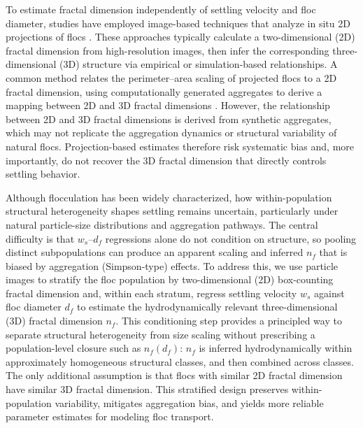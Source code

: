 \documentclass{agujournal2019}
\providecommand{\DIFadd}[1]{{\protect\color{blue}#1}}
\begin{document}
To estimate fractal dimension independently of settling velocity and floc diameter, studies have employed image-based techniques that analyze in situ 2D projections of flocs \cite{jarvis2005measuring}. These approaches typically calculate a two-dimensional (2D) fractal dimension from high-resolution images, then infer the corresponding three-dimensional (3D) structure via empirical or simulation-based relationships. A common method relates the perimeter--area scaling of projected flocs to a 2D fractal dimension, using computationally generated aggregates to derive a mapping between 2D and 3D fractal dimensions \cite{lee2004prediction, maggi2004method, tang2015reconstructing}. However, the relationship between 2D and 3D fractal dimensions is derived from synthetic aggregates, which may not replicate the aggregation dynamics or structural variability of natural flocs. Projection-based estimates therefore risk systematic bias and, more importantly, do not recover the 3D fractal dimension that directly controls settling behavior.

Although flocculation has been widely characterized, how within-population structural heterogeneity shapes settling remains uncertain, particularly under natural particle-size distributions and aggregation pathways. The central difficulty is that $w_s$--$d_f$ regressions alone do not condition on structure, so pooling distinct subpopulations can produce an apparent scaling and inferred $n_f$ that is biased by aggregation (Simpson-type) effects. To address this, we use particle images to stratify the floc population by two-dimensional (2D) box-counting fractal dimension and, within each stratum, regress settling velocity $w_s$ against floc diameter $d_f$ to estimate the hydrodynamically relevant three-dimensional (3D) fractal dimension $n_f$. \DIFadd{This conditioning step provides a principled way to separate structural heterogeneity from size scaling without prescribing a population-level closure such as $n_f(d_f)$: $n_f$ is inferred hydrodynamically within approximately homogeneous structural classes, and then combined across classes. The only additional assumption is that flocs with similar 2D fractal dimension have similar 3D fractal dimension.} This stratified design preserves within-population variability, mitigates aggregation bias, and yields more reliable parameter estimates for modeling floc transport.
\end{document}
